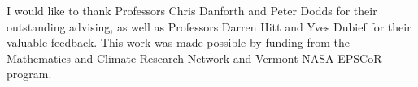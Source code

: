 \begin{acknowledgements}
I would like to thank Professors Chris Danforth and Peter Dodds for their outstanding advising, as well as Professors Darren Hitt and Yves Dubief for their valuable feedback.
This work was made possible by funding from the Mathematics and Climate Research Network and Vermont NASA EPSCoR program.
\end{acknowledgements}
